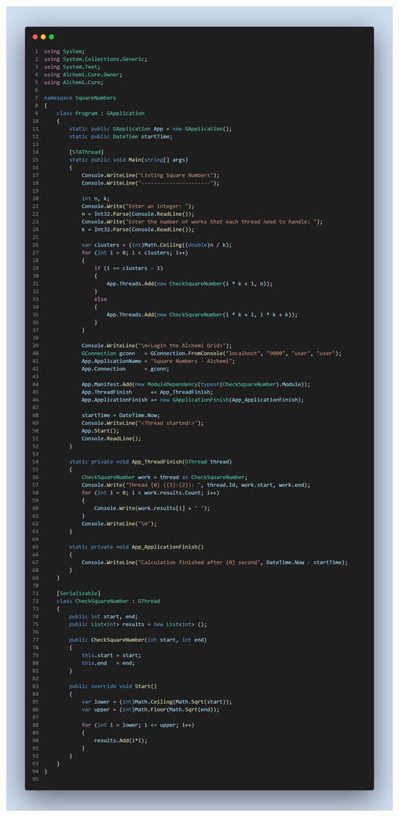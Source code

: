 \documentclass[12pt,a4paper]{report}
\begin{document}
\begin{center}
\includegraphics[trim=0in 32in 0in 0in, clip, scale=.23]{./Figures/SquareNumbers/SquareNumbers}
\clearpage

\end{center}
\end{document}
